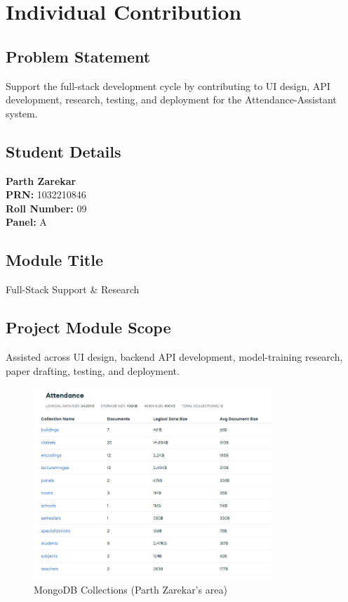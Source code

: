 \documentclass[openany]{report}
\begin{document}
\chapter{Individual Contribution}

\section{Problem Statement}
Support the full-stack development cycle by contributing to UI design, API development, research, testing, and deployment for the Attendance-Assistant system.

\section{Student Details}
\textbf{Parth Zarekar} \\
\textbf{PRN:} 1032210846 \\
\textbf{Roll Number:} 09 \\
\textbf{Panel:} A \\

\section{Module Title}
Full-Stack Support \& Research


\section{Project Module Scope}
Assisted across UI design, backend API development, model-training research, paper drafting, testing, and deployment.
\begin{figure}[H]
    \centering
    \includegraphics[width=0.8\textwidth]{../imgs/mongo.jpg}
    \caption{MongoDB Collections (Parth Zarekar’s area)}
    \label{fig:parth_mongodb}
\end{figure}
\end{document}
